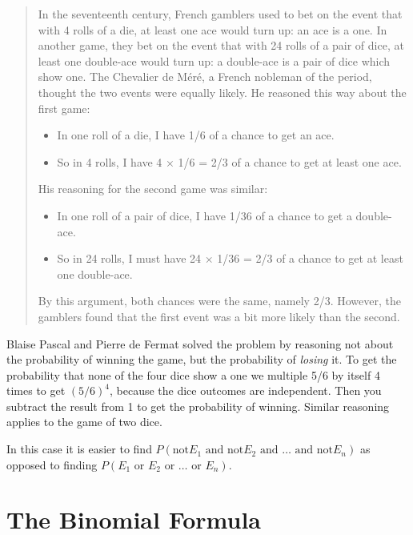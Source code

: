 \documentclass[
]{book}
\providecommand{\tightlist}{%
  \setlength{\itemsep}{0pt}\setlength{\parskip}{0pt}}
\begin{document}
\begin{quote}
In the seventeenth century, French gamblers used to bet on the event that with 4 rolls of a die, at least one ace would turn up: an ace is a one. In another game, they bet on the event that with 24 rolls of a pair of dice, at least one double-ace would turn up: a double-ace is a pair of dice which show one.
The Chevalier de Méré, a French nobleman of the period, thought the two events were equally likely. He reasoned this way about the first game:

\begin{itemize}
\tightlist
\item
  In one roll of a die, I have 1/6 of a chance to get an ace.
\item
  So in 4 rolls, I have 4 × 1/6 = 2/3 of a chance to get at least one ace.
\end{itemize}

His reasoning for the second game was similar:

\begin{itemize}
\tightlist
\item
  In one roll of a pair of dice, I have 1/36 of a chance to get a double-ace.
\item
  So in 24 rolls, I must have 24 × 1/36 = 2/3 of a chance to get at least one double-ace.
\end{itemize}

By this argument, both chances were the same, namely 2/3. However, the gamblers found that the first event was a bit more likely than the second.
\end{quote}

Blaise Pascal and Pierre de Fermat solved the problem by reasoning not about the probability of winning the game, but the probability of \emph{losing} it. To get the probability that none of the four dice show a one we multiple 5/6 by itself 4 times to get \((5/6)^4\), because the dice outcomes are independent. Then you subtract the result from 1 to get the probability of winning. Similar reasoning applies to the game of two dice.

In this case it is easier to find \(P(\text{not}E_1 \text{ and } \text{not}E_2 \text{ and } \dots \text{ and } \text{not}E_n)\) as opposed to finding \(P(E_1 \text{ or } E_2 \text{ or } \dots \text{ or } E_n)\).

\hypertarget{binomial_formula}{%
\chapter{The Binomial Formula}\label{binomial_formula}}
\end{document}
